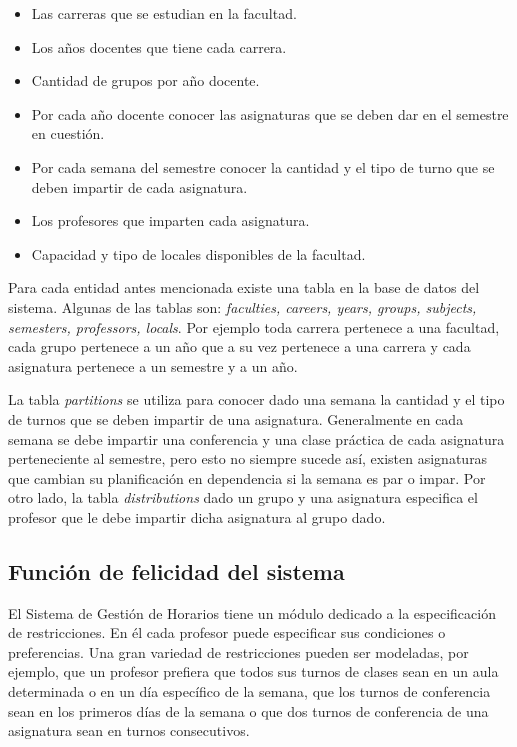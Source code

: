 \begin{itemize}

\item Las carreras que se estudian en la facultad.
\item Los años docentes que tiene cada carrera.
\item Cantidad de grupos por año docente.
\item Por cada año docente conocer las asignaturas que se deben dar en el semestre en cuesti\'on.
\item Por cada semana del semestre conocer la cantidad y el tipo de turno que se deben impartir de cada asignatura.
\item Los profesores que imparten cada asignatura.
\item Capacidad y tipo de locales disponibles de la facultad.

\end{itemize}

Para cada entidad antes mencionada existe una tabla en la base de datos del sistema. Algunas de las tablas son: \emph{faculties, careers, years, groups, subjects, semesters, professors, locals}. Por ejemplo toda carrera pertenece a una facultad, cada grupo pertenece a un año que a su vez pertenece a una carrera y cada asignatura pertenece a un semestre y a un año.

La tabla \emph{partitions} se utiliza para conocer dado una semana la cantidad y el tipo de turnos que se deben impartir de una asignatura. Generalmente en cada semana se debe impartir una conferencia y una clase pr\'actica de cada asignatura perteneciente al semestre, pero esto no siempre sucede as\'i, existen asignaturas que cambian su planificaci\'on en dependencia si la semana es par o impar. Por otro lado, la tabla \emph{distributions} dado un grupo y una asignatura especifica el profesor que le debe impartir dicha asignatura al grupo dado.

\subsection{Funci\'on de felicidad del sistema}

El Sistema de Gesti\'on de Horarios tiene un m\'odulo dedicado a la especificaci\'on de restricciones. En \'el cada profesor puede especificar sus condiciones o preferencias. Una gran variedad de restricciones pueden ser modeladas, por ejemplo, que un profesor prefiera que todos sus turnos de clases sean en un aula determinada o en un d\'ia espec\'ifico de la semana, que los turnos de conferencia sean en los primeros d\'ias de la semana o que dos turnos de conferencia de una asignatura sean en turnos consecutivos.

